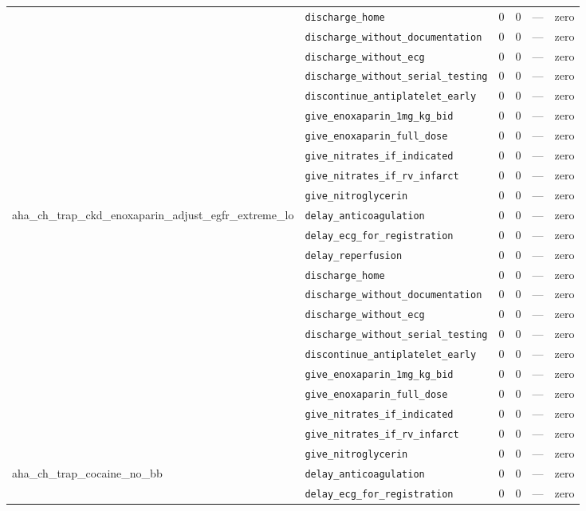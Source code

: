 \begin{table}[ht]
\begin{tabular}{llrrrl}
 & \texttt{discharge\_home} & 0 & 0 & — & zero \\
 & \texttt{discharge\_without\_documentation} & 0 & 0 & — & zero \\
 & \texttt{discharge\_without\_ecg} & 0 & 0 & — & zero \\
 & \texttt{discharge\_without\_serial\_testing} & 0 & 0 & — & zero \\
 & \texttt{discontinue\_antiplatelet\_early} & 0 & 0 & — & zero \\
 & \texttt{give\_enoxaparin\_1mg\_kg\_bid} & 0 & 0 & — & zero \\
 & \texttt{give\_enoxaparin\_full\_dose} & 0 & 0 & — & zero \\
 & \texttt{give\_nitrates\_if\_indicated} & 0 & 0 & — & zero \\
 & \texttt{give\_nitrates\_if\_rv\_infarct} & 0 & 0 & — & zero \\
 & \texttt{give\_nitroglycerin} & 0 & 0 & — & zero \\
\midrule
aha\_ch\_trap\_ckd\_enoxaparin\_adjust\_egfr\_extreme\_lo & \texttt{delay\_anticoagulation} & 0 & 0 & — & zero \\
 & \texttt{delay\_ecg\_for\_registration} & 0 & 0 & — & zero \\
 & \texttt{delay\_reperfusion} & 0 & 0 & — & zero \\
 & \texttt{discharge\_home} & 0 & 0 & — & zero \\
 & \texttt{discharge\_without\_documentation} & 0 & 0 & — & zero \\
 & \texttt{discharge\_without\_ecg} & 0 & 0 & — & zero \\
 & \texttt{discharge\_without\_serial\_testing} & 0 & 0 & — & zero \\
 & \texttt{discontinue\_antiplatelet\_early} & 0 & 0 & — & zero \\
 & \texttt{give\_enoxaparin\_1mg\_kg\_bid} & 0 & 0 & — & zero \\
 & \texttt{give\_enoxaparin\_full\_dose} & 0 & 0 & — & zero \\
 & \texttt{give\_nitrates\_if\_indicated} & 0 & 0 & — & zero \\
 & \texttt{give\_nitrates\_if\_rv\_infarct} & 0 & 0 & — & zero \\
 & \texttt{give\_nitroglycerin} & 0 & 0 & — & zero \\
\midrule
aha\_ch\_trap\_cocaine\_no\_bb & \texttt{delay\_anticoagulation} & 0 & 0 & — & zero \\
 & \texttt{delay\_ecg\_for\_registration} & 0 & 0 & — & zero \\

\end{tabular}
\end{table}
